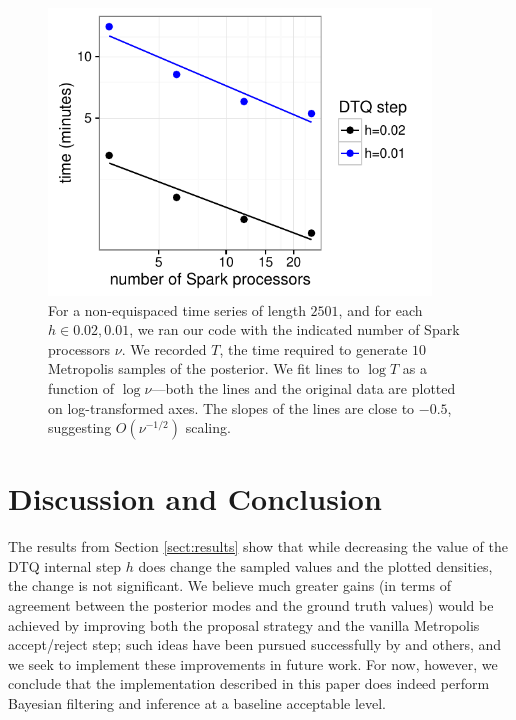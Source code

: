 \documentclass[wcp]{jmlr}
\begin{document}
\begin{figure}[th]
\begin{center}
\includegraphics[width=4in]{scaling2}
\end{center}
\vspace{-0.25in}
\caption{For a non-equispaced time series of length $2501$, and for
  each $h \in {0.02,0.01}$, we ran our code with the indicated number
  of Spark processors $\nu$.  We recorded $T$, the time required to generate
  $10$ Metropolis samples of the posterior.  We fit lines to $\log T$ as a function of $\log
  \nu$---both the lines and the original data are plotted on
  log-transformed axes.  The slopes of the lines are close to $-0.5$, suggesting $O(\nu^{-1/2})$ scaling.}
\label{fig:scaling2}
\end{figure}

\section{Discussion and Conclusion}
\label{sect:conclusion}
The results from Section \ref{sect:results}
show that while decreasing the value of the DTQ internal step $h$ does
change the sampled values and the plotted densities, the change is not
significant.  We believe much greater gains (in terms of agreement
between the posterior modes and the ground truth values) would be achieved by
improving both the proposal strategy and the vanilla Metropolis
accept/reject step; such ideas have been pursued successfully by \citet{fuchs2013inference} and others, and we seek
to implement these improvements in future work.  For now, however, we
conclude that the implementation described in this paper does indeed
perform Bayesian filtering and inference at a baseline acceptable
level.
\end{document}
